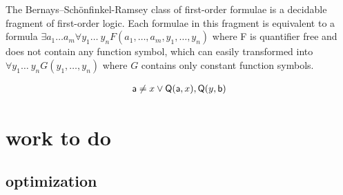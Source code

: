\begin{frame}
	\begin{block}{}
		The Bernays–Schönfinkel-Ramsey class of first-order formulae is a decidable fragment of first-order logic.
Each formulae in this fragment is equivalent to a formula
$\exists a_1\ldots a_m \forall y_1\ldots\ y_n F(a_1,\ldots,a_m,y_1,\ldots,y_n)$ 
where F is quantifier free and does not contain any function symbol,
which can easily transformed into
$\forall y_1\ldots\ y_n G(y_1,\ldots,y_n)$
where $G$ contains only constant function symbols.
		\end{block}
		
		
		
		\begin{example}
			\vspace{-1em}
			\begin{gather*}
				{\mathsf a}\neq x\lor{\mathsf Q}({\mathsf a},x), {\mathsf Q}(y,{\mathsf b})
			\end{gather*}
		\end{example}
	\end{frame}

\section{work to do}



\subsection{optimization}

 
